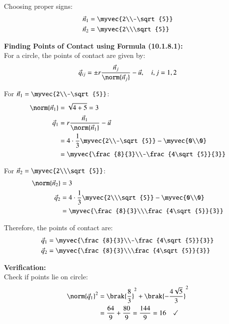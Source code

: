 \documentclass[article]{IEEEtran}
\begin{document}
	Choosing proper signs:
	\begin{align}
		\vec{n}_1 &= \myvec{2\\-\sqrt{5}}\\
		\vec{n}_2 &= \myvec{2\\\sqrt{5}}
	\end{align}
	
	\textbf{Finding Points of Contact using Formula (10.1.8.1):}\\
	For a circle, the points of contact are given by:
	\begin{align}
		\vec{q}_{ij} = \pm r\frac{\vec{n}_j}{\norm{\vec{n}_j}} - \vec{u}, \quad i,j = 1,2
	\end{align}
	
	For $\vec{n}_1 = \myvec{2\\-\sqrt{5}}$:
	\begin{align}
		\norm{\vec{n}_1} &= \sqrt{4 + 5} = 3\\
		\vec{q}_1 &= r\frac{\vec{n}_1}{\norm{\vec{n}_1}} - \vec{u}\\
		&= 4 \cdot \frac{1}{3}\myvec{2\\-\sqrt{5}} - \myvec{0\\0}\\
		&= \myvec{\frac{8}{3}\\-\frac{4\sqrt{5}}{3}}
	\end{align}
	
	For $\vec{n}_2 = \myvec{2\\\sqrt{5}}$:
	\begin{align}
		\norm{\vec{n}_2} &= 3\\
		\vec{q}_2 &= 4 \cdot \frac{1}{3}\myvec{2\\\sqrt{5}} - \myvec{0\\0}\\
		&= \myvec{\frac{8}{3}\\\frac{4\sqrt{5}}{3}}
	\end{align}
	
	Therefore, the points of contact are:
	\begin{align}
		\vec{q}_1 &= \myvec{\frac{8}{3}\\-\frac{4\sqrt{5}}{3}}\\
		\vec{q}_2 &= \myvec{\frac{8}{3}\\\frac{4\sqrt{5}}{3}}
	\end{align}
	
	\textbf{Verification:}\\
	Check if points lie on circle:
	\begin{align}
		\norm{\vec{q}_1}^2 &= \brak{\frac{8}{3}}^2 + \brak{-\frac{4\sqrt{5}}{3}}^2\\
		&= \frac{64}{9} + \frac{80}{9} = \frac{144}{9} = 16 \quad \checkmark
	\end{align}
	
\end{document}
